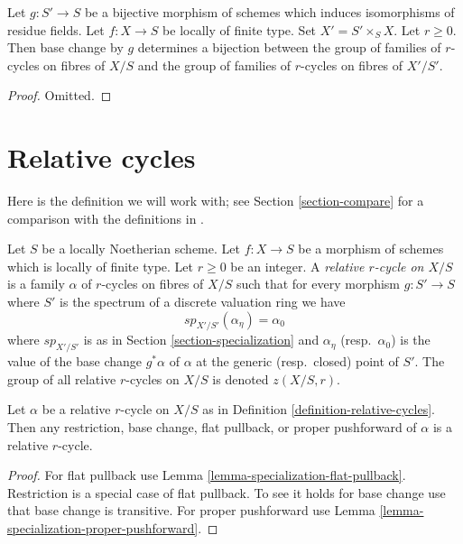 \begin{lemma}
\label{lemma-pullback-universally-bijective}
Let $g : S' \to S$ be a bijective morphism of schemes
which induces isomorphisms of residue fields.
Let $f : X \to S$ be locally of finite type. Set $X' = S' \times_S X$.
Let $r \geq 0$. Then base change by $g$ determines a bijection
between the group of families of $r$-cycles on fibres of $X/S$ and
the group of families of $r$-cycles on fibres of $X'/S'$.
\end{lemma}

\begin{proof}
Omitted.
\end{proof}








\section{Relative cycles}
\label{section-families-specialization}

\noindent
Here is the definition we will work with; see Section \ref{section-compare}
for a comparison with the definitions in \cite{SV}.

\begin{definition}
\label{definition-relative-cycles}
Let $S$ be a locally Noetherian scheme. Let $f : X \to S$ be a morphism of
schemes which is locally of finite type. Let $r \geq 0$ be an integer.
A {\it relative $r$-cycle on $X/S$} is a family $\alpha$ of $r$-cycles
on fibres of $X/S$ such that for every morphism $g : S' \to S$
where $S'$ is the spectrum of a discrete valuation ring we have
$$
sp_{X'/S'}(\alpha_\eta) = \alpha_0
$$
where $sp_{X'/S'}$ is as in Section \ref{section-specialization}
and $\alpha_\eta$ (resp.\ $\alpha_0$) is the value of the base change
$g^*\alpha$ of $\alpha$ at the generic (resp.\ closed) point of $S'$.
The group of all relative $r$-cycles on $X/S$ is denoted $z(X/S, r)$.
\end{definition}

\begin{lemma}
\label{lemma-relative-cycle-functoriality}
Let $\alpha$ be a relative $r$-cycle on $X/S$ as in
Definition \ref{definition-relative-cycles}.
Then any restriction, base change, flat pullback, or proper pushforward
of $\alpha$ is a relative $r$-cycle.
\end{lemma}

\begin{proof}
For flat pullback use Lemma \ref{lemma-specialization-flat-pullback}.
Restriction is a special case of flat pullback. To see it holds for
base change use that base change is transitive.
For proper pushforward use Lemma \ref{lemma-specialization-proper-pushforward}.
\end{proof}

